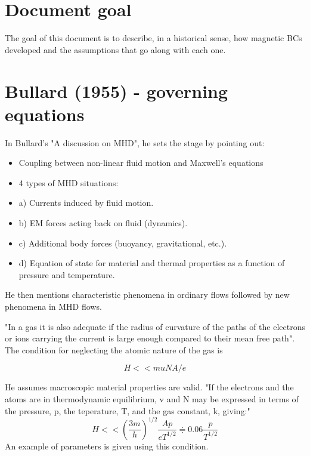 \documentclass[11pt]{article}
\begin{document}
\doublespacing
\MOONSTITLE
\maketitle

\section{Document goal}
The goal of this document is to describe, in a historical sense, how magnetic BCs developed and the assumptions that go along with each one.

\section{Bullard (1955) - governing equations}
In Bullard's "A discussion on MHD", he sets the stage by pointing out:
\begin{itemize}
\item Coupling between non-linear fluid motion and Maxwell's equations
\item 4 types of MHD situations:
\item a) Currents induced by fluid motion.
\item b) EM forces acting back on fluid (dynamics).
\item c) Additional body forces (buoyancy, gravitational, etc.).
\item d) Equation of state for material and thermal properties as a function of pressure and temperature.
\end{itemize}
He then mentions characteristic phenomena in ordinary flows followed by new phenomena in MHD flows.

"In a gas it is also adequate if the radius of curvature of the paths of the electrons or ions carrying the current is large enough compared to their mean free path". The condition for neglecting the atomic nature of the gas is

\begin{equation}
	H << m u N A / e
\end{equation}

He assumes macroscopic material properties are valid. "If the electrons and the atoms are in thermodynamic equilibrium, v and N may be expressed in terms of the pressure, p, the teperature, T, and the gas constant, k, giving:"
\begin{equation}
	H << \left( \frac{3m}{h} \right)^{1/2} \frac{Ap}{eT^{1/2}} \doteqdot 0.06 \frac{p}{T^{1/2}}
\end{equation}
An example of parameters is given using this condition.
\end{document}
